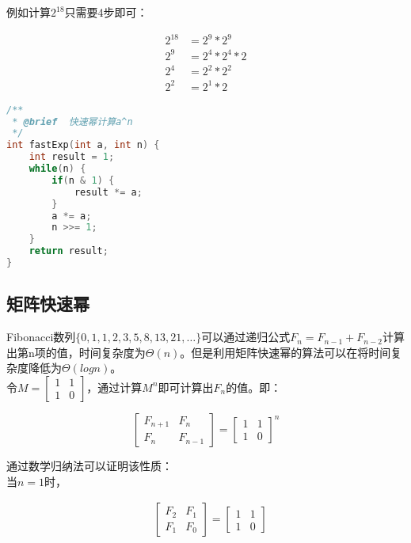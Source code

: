 例如计算$ 2^{18} $只需要4步即可：

\vspace{-1cm}

\begin{align*}
	2^{18} & = 2^9 * 2^9     \\
	2^9    & = 2^4 * 2^4 * 2 \\
	2^4    & = 2^2 * 2^2     \\
	2^2    & = 2^1 * 2
\end{align*}


\begin{lstlisting}[language=C]
/**
 * @brief  快速幂计算a^n
 */
int fastExp(int a, int n) {
    int result = 1;
    while(n) {
        if(n & 1) {
            result *= a;
        }
        a *= a;
        n >>= 1;
    }
    return result;
}
\end{lstlisting}

\vspace{0.5cm}

\subsection{矩阵快速幂}

Fibonacci数列$ \{0, 1, 1, 2, 3, 5, 8, 13, 21, \dots \} $可以通过递归公式$ F_n = F_{n-1} + F_{n-2} $计算出第n项的值，时间复杂度为$ \Theta(n) $。但是利用矩阵快速幂的算法可以在将时间复杂度降低为$ \Theta(logn) $。\\

令$ M = \left[\begin{matrix} 1 & 1\\ 1 & 0\end{matrix} \right] $，通过计算$ M^n $即可计算出$ F_n $的值。即：

$$
	\left[\begin{matrix} F_{n+1} & F_n\\ F_n & F_{n-1} \end{matrix} \right]
	= \left[\begin{matrix} 1 & 1\\ 1 & 0 \end{matrix} \right]^n
$$

通过数学归纳法可以证明该性质：\\

当$ n = 1 $时，

\vspace{-1cm}

\begin{align*}
	 & \left[\begin{matrix} F_2 & F_1\\ F_1 & F_0 \end{matrix} \right]
	= \left[\begin{matrix} 1 & 1\\ 1 & 0 \end{matrix} \right]  \\
\end{align*}

